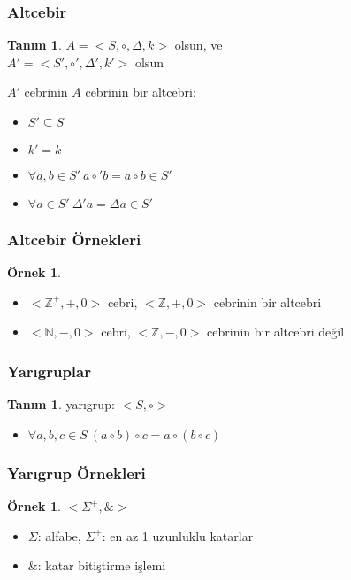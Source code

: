 \documentclass[dvipsnames]{beamer}
\theoremstyle{definition}
\newtheorem{tanim}[theorem]{Tanım}
\theoremstyle{example}
\newtheorem{ornek}[theorem]{Örnek}
\theoremstyle{plain}
\begin{document}
\begin{frame}
  \frametitle{Altcebir}

  \begin{tanim}
    $A = <S,\circ,\Delta,k>$ olsun, ve\\
    $A' = <S',\circ',\Delta',k'>$ olsun

    \medskip
    $A'$ cebrinin $A$ cebrinin bir \alert{altcebri}:

    \pause
    \medskip
    \begin{itemize}
      \item $S' \subseteq S$
      \item $k' = k$
      \item $\forall a,b \in S'~a \circ' b = a \circ b \in S'$
      \item $\forall a \in S'~\Delta' a = \Delta a \in S'$
    \end{itemize}
  \end{tanim}
\end{frame}

\begin{frame}
  \frametitle{Altcebir Örnekleri}

  \begin{ornek}
    \begin{itemize}
      \item $<\mathbb{Z}^+,+,0>$ cebri,
        $<\mathbb{Z},+,0>$ cebrinin bir altcebri

      \pause
      \item $<\mathbb{N},-,0>$ cebri,
        $<\mathbb{Z},-,0>$ cebrinin bir altcebri değil
    \end{itemize}
  \end{ornek}
\end{frame}

\begin{frame}
  \frametitle{Yarıgruplar}

  \begin{tanim}
    \alert{yarıgrup}: $<S,\circ>$
    \begin{itemize}
      \item $\forall a,b,c \in S~(a \circ b) \circ c = a \circ (b \circ c)$
    \end{itemize}
  \end{tanim}
\end{frame}

\begin{frame}
  \frametitle{Yarıgrup Örnekleri}

  \begin{ornek}
    $<\Sigma^+,\&>$

    \begin{itemize}
      \item $\Sigma$: alfabe, $\Sigma^+$: en az 1 uzunluklu katarlar
      \item $\&$: katar bitiştirme işlemi
    \end{itemize}
  \end{ornek}
\end{frame}
\end{document}
